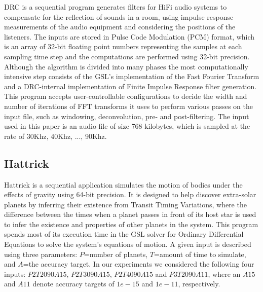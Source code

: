 \documentclass{sig-alternate}
\newcommand{\sui}[1]{%
  \textcolor{green}{SC-#1}
}
\begin{document}
DRC is a sequential program generates filters for HiFi audio systems to compensate for the reflection of sounds in a room, using impulse response measurements of the audio equipment and considering the positions of the listeners.
The inputs are stored in Pulse Code Modulation (PCM) format, which is an array of 32-bit floating point numbers representing the samples at each sampling time step and the computations are performed using 32-bit precision.
Although the algorithm is divided into many phases the most computationally intensive step consists of the GSL's implementation of the Fast Fourier Transform and a DRC-internal implementation of Finite Impulse Response filter generation.
This program accepts user-controllable configurations to decide the width and number of iterations of FFT transforms it uses to perform various passes on the input file, such as windowing, deconvolution, pre- and post-filtering.
The input used in this paper is an audio file of size 768 kilobytes, which is sampled at the rate of 30Khz, 40Khz, ..., 90Khz.

\subsection{Hattrick}
\label{sec:apps:hattrick}
Hattrick is a sequential application simulates the motion of bodies under the effects of gravity using 64-bit precision.
It is designed to help discover extra-solar planets by inferring their existence from Transit Timing Variations, where the difference between the times when a planet passes in front of its host star is used to infer the existence and properties of other planets in the system.
This program spends most of its execution time in the GSL solver for Ordinary Differential Equations to solve the system's equations of motion.
A given input is described using three parameters: $P$=number of planets, $T$=amount of time to simulate, and $A$=the accuracy target.
In our experiments we considered the following four inputs: $P2T2090A15$, $P2T3090A15$, $P2T4090A15$ and $P3T2090A11$, where an $A15$ and $A11$ denote accuracy targets of $1e-15$ and $1e-11$, respectively.

\end{document}
